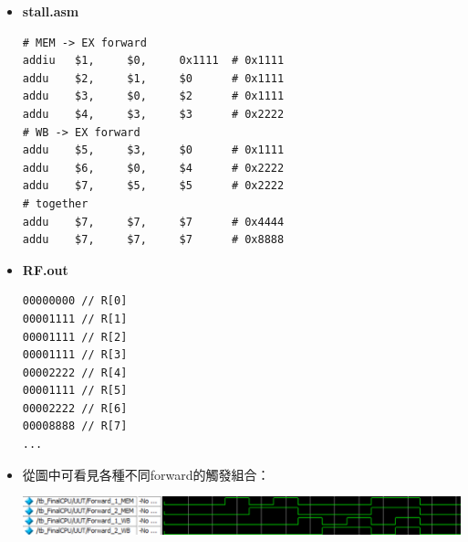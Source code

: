 \documentclass[12pt]{article}
\begin{document}
\begin{itemize}
    \item \textbf{stall.asm}
    \begin{lstlisting}[language={[mips]Assembler}, frame=single]
# MEM -> EX forward
addiu   $1,     $0,     0x1111  # 0x1111
addu    $2,     $1,     $0      # 0x1111
addu    $3,     $0,     $2      # 0x1111
addu    $4,     $3,     $3      # 0x2222
# WB -> EX forward
addu    $5,     $3,     $0      # 0x1111
addu    $6,     $0,     $4      # 0x2222
addu    $7,     $5,     $5      # 0x2222
# together
addu    $7,     $7,     $7      # 0x4444
addu    $7,     $7,     $7      # 0x8888
    \end{lstlisting}

    \item \textbf{RF.out}
    \begin{lstlisting}[language={}]
00000000 // R[0]
00001111 // R[1]
00001111 // R[2]
00001111 // R[3]
00002222 // R[4]
00001111 // R[5]
00002222 // R[6]
00008888 // R[7]
...
    \end{lstlisting}

    \item 從圖中可看見各種不同forward的觸發組合：
    \begin{center}
        \includegraphics[width=\linewidth]{forward.png}
    \end{center}
\end{itemize}
\end{document}
